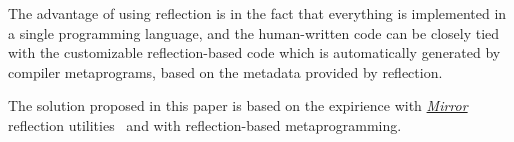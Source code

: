 The advantage of using reflection is in the fact that everything
is implemented in a single programming language, and the human-written
code can be closely tied with the customizable reflection-based
code which is automatically generated by compiler metaprograms,
based on the metadata provided by reflection.

The solution proposed in this paper is based on the expirience with
\href{http://kifri.fri.uniza.sk/~chochlik/mirror-lib/html/}{\em Mirror}
reflection utilities~\cite{mirror-doc-cpp11} and with reflection-based
metaprogramming.
